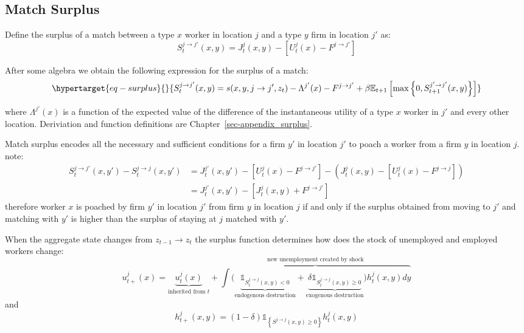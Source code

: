 \documentclass[
  letterpaper,
  DIV=11,
  numbers=noendperiod]{scrreprt}
\begin{document}
\hypertarget{match-surplus}{%
\subsection{Match Surplus}\label{match-surplus}}

Define the surplus of a match between a type \(x\) worker in location
\(j\) and a type \(y\) firm in location \(j'\) as:
\[S^{j\to j'}_{t}(x,y) = J^{j}_{t}(x,y) - [U^{j}_t(x) - F^{j\to j'}]\]

After some algebra we obtain the following expression for the surplus of
a match:
\begin{equation}\protect\hypertarget{eq-surplus}{}{S_{t}^{j\to j'}(x,y) = s(x,y,j \to j',z_t) - \Lambda^{j'}(x) - F^{j \to j'} + \beta\mathbb{E}_{t+1}\left[\max\left\{0, S^{j'\to j'}_{t+1}(x,y)\right\}\right]}\label{eq-surplus}\end{equation}

where \(\Lambda^{j'}(x)\) is a function of the expected value of the
difference of the instantaneous utility of a type \(x\) worker in \(j'\)
and every other location. Deriviation and function definitions are
Chapter~\ref{sec-appendix_surplus}.

Match surplus encodes all the necessary and sufficient conditions for a
firm \(y'\) in location \(j'\) to poach a worker from a firm \(y\) in
location \(j\). note: \begin{align*}
  S_t^{j\to j'}(x,y') - S^{j \to j}_t(x,y') &= J^{j'}_{t}(x,y') - [U^{j}_t(x) - F^{j\to j'}] - \left(J^{j}_{t}(x,y) - [U^{j}_t(x) - F^{j\to j}]\right) \\ 
  &=  J^{j'}_{t}(x,y') - [ J^{j}_{t}(x,y) + F^{j\to j'}]
\end{align*} therefore worker \(x\) is poached by firm \(y'\) in
location \(j'\) from firm \(y\) in location \(j\) if and only if the
surplus obtained from moving to \(j'\) and matching with \(y'\) is
higher than the surplus of staying at \(j\) matched with \(y'\).

When the aggregate state changes from \(z_{t-1} \to z_t\) the surplus
function determines how does the stock of unemployed and employed
workers change:
\[u^{j}_{t+}(x) = \underbrace{u^j_t(x)}_{\text{inherited from }t} + \overbrace{\int \Big(\underbrace{\mathbb{1}_{S^{j \to j}_t(x,y)<0}}_{\text{endogenous destruction}} + \underbrace{\delta\mathbb{1}_{S^{j \to j}_t(x,y)\geq0}}_{\text{exogenous destruction}}\Big)h^j_t(x,y)dy}^{\text{new unemployment created by shock}}\]
and
\[h^{j}_{t+}(x,y) = (1-\delta)\mathbb{1}_{\left\{S^{j \to j}(x,y)\geq 0\right\}}h^j_t(x,y)\]
\end{document}
